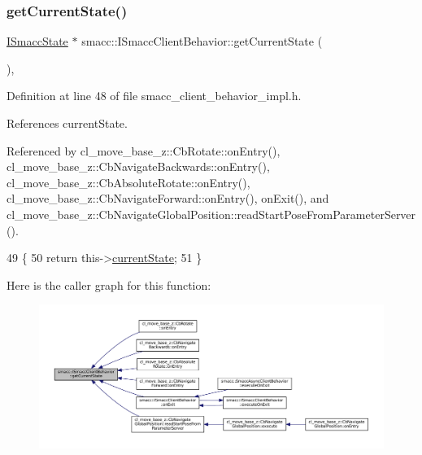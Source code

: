 \subsubsection{\texorpdfstring{get\+Current\+State()}{getCurrentState()}}
{\footnotesize\ttfamily \hyperlink{classsmacc_1_1ISmaccState}{I\+Smacc\+State} $\ast$ smacc\+::\+I\+Smacc\+Client\+Behavior\+::get\+Current\+State (\begin{DoxyParamCaption}{ }\end{DoxyParamCaption})\hspace{0.3cm}{\ttfamily [inline]}, {\ttfamily [protected]}}



Definition at line 48 of file smacc\+\_\+client\+\_\+behavior\+\_\+impl.\+h.



References current\+State.



Referenced by cl\+\_\+move\+\_\+base\+\_\+z\+::\+Cb\+Rotate\+::on\+Entry(), cl\+\_\+move\+\_\+base\+\_\+z\+::\+Cb\+Navigate\+Backwards\+::on\+Entry(), cl\+\_\+move\+\_\+base\+\_\+z\+::\+Cb\+Absolute\+Rotate\+::on\+Entry(), cl\+\_\+move\+\_\+base\+\_\+z\+::\+Cb\+Navigate\+Forward\+::on\+Entry(), on\+Exit(), and cl\+\_\+move\+\_\+base\+\_\+z\+::\+Cb\+Navigate\+Global\+Position\+::read\+Start\+Pose\+From\+Parameter\+Server().


\begin{DoxyCode}
49 \{
50     \textcolor{keywordflow}{return} this->\hyperlink{classsmacc_1_1ISmaccClientBehavior_a5a6658a2deb72b700ae595e594617616}{currentState};
51 \}
\end{DoxyCode}
Here is the caller graph for this function\+:
\nopagebreak
\begin{figure}[H]
\begin{center}
\leavevmode
\includegraphics[width=350pt]{classsmacc_1_1ISmaccClientBehavior_a34fde34e48fa13db622ee60d8374d0b8_icgraph}
\end{center}
\end{figure}
\mbox{\label{classsmacc_1_1ISmaccClientBehavior_a18e4bec9460b010f2894c0f7e7064a34}} 
